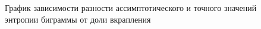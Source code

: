 \documentclass[a4paper,12pt]{article}
\theoremstyle{plain}
\begin{document}
			\begin{figure}[h]
				\caption{График зависимости разности ассимптотического и точного значений энтропии биграммы от доли вкрапления}
				\label{ris:"h2.png"}
			\end{figure}
		
\end{document}
